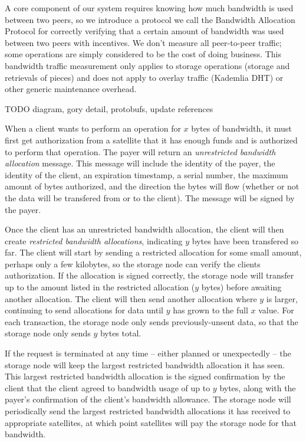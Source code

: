 \documentclass[11pt,fleqn,openany]{book}
\newcommand{\todo}[1]{{\color{red} TODO #1 }}
\begin{document}
A core component of our system requires knowing how much bandwidth is used
between two peers, so we introduce a protocol we call the Bandwidth Allocation
Protocol for correctly verifying that a certain amount of bandwidth was used
between two peers with incentives.
We don't measure all peer-to-peer traffic;
some operations are simply considered to be
the cost of doing business. This bandwidth traffic measurement only applies
to storage operations (storage and retrievals of pieces) and does not
apply to overlay traffic (Kademlia DHT) or other generic maintenance overhead.

\todo{diagram, gory detail, protobufs, update references}

When a client wants to perform an operation for $x$ bytes of bandwidth, it must
first get authorization from a satellite
that it has enough funds and is authorized to perform that operation.
The payer will return an {\em unrestricted
bandwidth allocation} message. This message will include the identity of the
payer, the identity of the client, an expiration timestamp, a serial number,
the maximum amount of bytes authorized, and the direction the bytes will flow
(whether or not the data will be transfered from or to the client).
The message will be signed by the payer.


Once the client has an unrestricted bandwidth allocation, the client will then
create {\em restricted bandwidth allocations},
indicating $y$ bytes have been transfered so far. The client
will start by sending a restricted allocation for some small amount,
perhaps only a few kilobytes,
so the storage node can verify the clients authorization.
If the allocation is signed correctly, the storage node will
transfer up to the amount listed in the restricted allocation ($y$ bytes) before
awaiting another allocation. The client will then send another allocation where
$y$ is larger, continuing to send allocations for data until $y$ has grown to
the full $x$ value.
For each transaction, the storage node only sends previously-unsent data,
so that the storage node only sends $y$ bytes total.

If the request is terminated at any time --
either planned or unexpectedly --
the storage node will keep the largest restricted bandwidth allocation it has
seen.
This largest restricted bandwidth allocation is the signed confirmation
by the client that the client agreed to bandwidth usage of up to $y$
bytes, along with the payer's confirmation of the client's bandwidth allowance.
The storage node will periodically send the largest restricted bandwidth
allocations it has received to appropriate satellites, at which point
satellites will pay the storage node for that bandwidth.
\end{document}
